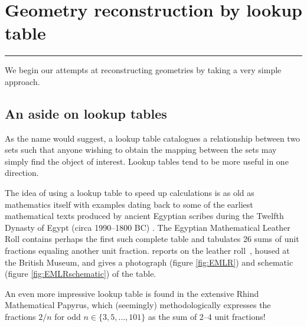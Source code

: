 \chapter{Geometry reconstruction by lookup table}\label{ch:lookupTable}

\vspace{-1.5 em}
\begin{addmargin}[-0.5cm]{0cm}
  \minitoc
\end{addmargin}
\hrule
\vspace{1.5 em}

\noindent
We begin our attempts at reconstructing geometries by taking a very simple approach.

\section{An aside on lookup tables}
As the name would suggest, a lookup table catalogues a relationship between two sets such that anyone wishing to obtain the mapping between the sets may simply find the object of interest. Lookup tables tend to be more useful in one direction.

The idea of using a lookup table to speed up calculations is as old as mathematics itself with examples dating back to some of the earliest mathematical texts produced by ancient Egyptian scribes during the Twelfth Dynasty of Egypt (circa 1990--1800 BC) \citep[p. 1, footnote 4]{Neugebauer45}. The Egyptian Mathematical Leather Roll contains perhaps the first such complete table and tabulates 26 sums of unit fractions equaling another unit fraction. \citet{Glanville27} reports on the leather roll\footnotemark~, housed at the British Museum, and gives a photograph (figure \ref{fig:EMLR}) and schematic (figure \ref{fig:EMLRschematic}) of the table.


An even more impressive lookup table is found in the extensive Rhind Mathematical Papyrus, which (seemingly) methodologically expresses the fractions $2/n$ for odd $n \in \lbrace 3, 5, \dots, 101 \rbrace$ as the sum of 2--4 unit fractions!

